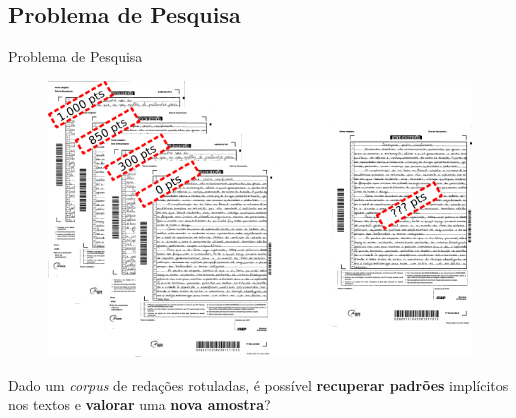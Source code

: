 \subsection{Problema de Pesquisa}
  \begin{frame}[fragile]{Problema de Pesquisa}
    \begin{figure}[H]
    \begin{center}
        \includegraphics[scale=0.50]{images/problema_pesquisa.png}
    \end{center}
    \end{figure}

    Dado um \textit{corpus} de redações rotuladas, é possível \textbf{recuperar padrões} 
    implícitos nos textos e \textbf{valorar} uma \textbf{nova amostra}?
  \end{frame}